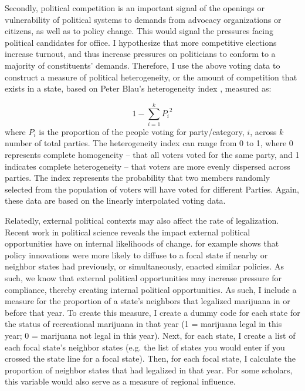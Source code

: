 Secondly, political competition is an important signal of the openings or vulnerability of political systems to demands from advocacy organizations or citizens, as well as to policy change. This would signal the pressures facing political candidates for office. I hypothesize that more competitive elections increase turnout, and thus increase pressures on politicians to conform to a majority of constituents' demands. Therefore, I use the above voting data to construct a measure of political heterogeneity, or the amount of competition that exists in a state, based on Peter Blau's heterogeneity index \citep{blau_1977a}, measured as:

\begin{equation}
1 - \sum_{i = 1}^{k}{P_{i}}^2
\end{equation}
where $P_{i}$ is the proportion of the people voting for party/category, $i$, across $k$ number of total parties. The heterogeneity index can range from 0 to 1, where 0 represents complete homogeneity -- that all voters voted for the same party, and 1 indicates complete heterogeneity -- that voters are more evenly dispersed across parties. The index represents the probability that two members randomly selected from the population of voters will have voted for different Parties. Again, these data are based on the linearly interpolated voting data.

Relatedly, external political contexts may also affect the rate of legalization. Recent work in political science reveals the impact external political opportunities have on internal likelihoods of change. \citet{boushey_2016} for example shows that policy innovations were more likely to diffuse to a focal state if nearby or neighbor states had previously, or simultaneously, enacted similar policies. As such, we know that external political opportunities may increase pressure for compliance, thereby creating internal political opportunities. As such, I include a measure for the proportion of a state's neighbors that legalized marijuana in or before that year. To create this measure, I create a dummy code for each state for the status of recreational marijuana in that year (1 = marijuana legal in this year; 0 = marijuana not legal in this year). Next, for each state, I create a list of each focal state's neighbor states (e.g. the list of states you would enter if you crossed the state line for a focal state). Then, for each focal state, I calculate the proportion of neighbor states that had legalized in that year. For some scholars, this variable would also serve as a measure of regional influence.

